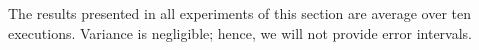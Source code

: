 \documentclass[Ingles]{ic-tese-v1}
\begin{document}
The results presented  in all experiments of this  section are average
over  ten  executions. Variance  is  negligible;  hence, we  will  not
provide error intervals.

\end{document}

